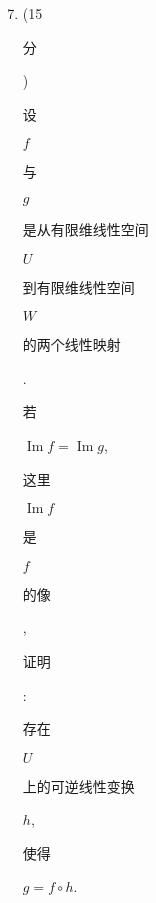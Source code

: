 \documentclass[10pt]{article}
\begin{document}
\begin{enumerate}
  \setcounter{enumi}{6}
  \item (15 \begin{CJK}{UTF8}{mj}分\end{CJK}) \begin{CJK}{UTF8}{mj}设\end{CJK} $f$ \begin{CJK}{UTF8}{mj}与\end{CJK} $g$ \begin{CJK}{UTF8}{mj}是从有限维线性空间\end{CJK} $U$ \begin{CJK}{UTF8}{mj}到有限维线性空间\end{CJK} $W$ \begin{CJK}{UTF8}{mj}的两个线性映射\end{CJK}. \begin{CJK}{UTF8}{mj}若\end{CJK} $\operatorname{Im} f=\operatorname{Im} g$, \begin{CJK}{UTF8}{mj}这里\end{CJK} $\operatorname{Im} f$ \begin{CJK}{UTF8}{mj}是\end{CJK} $f$ \begin{CJK}{UTF8}{mj}的像\end{CJK}, \begin{CJK}{UTF8}{mj}证明\end{CJK}: \begin{CJK}{UTF8}{mj}存在\end{CJK} $U$ \begin{CJK}{UTF8}{mj}上的可逆线性变换\end{CJK} $h$, \begin{CJK}{UTF8}{mj}使得\end{CJK} $g=f \circ h$.


\end{enumerate}
\end{document}
